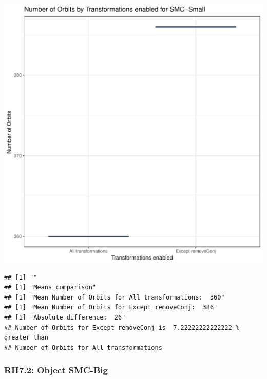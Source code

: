 \documentclass{article}\usepackage[]{graphicx}\usepackage[]{color}
\makeatletter
\def\maxwidth{ %
  \ifdim\Gin@nat@width>\linewidth
    \linewidth
  \else
    \Gin@nat@width
  \fi
}
\newenvironment{kframe}{%
 \def\at@end@of@kframe{}%
 \ifinner\ifhmode%
  \def\at@end@of@kframe{\end{minipage}}%
  \begin{minipage}{\columnwidth}%
 \fi\fi%
 \def\FrameCommand##1{\hskip\@totalleftmargin \hskip-\fboxsep
 \colorbox{shadecolor}{##1}\hskip-\fboxsep
     \hskip-\linewidth \hskip-\@totalleftmargin \hskip\columnwidth}%
 \MakeFramed {\advance\hsize-\width
   \@totalleftmargin\z@ \linewidth\hsize
   \@setminipage}}%
 {\par\unskip\endMakeFramed%
 \at@end@of@kframe}
\newenvironment{knitrout}{}{} %
\makeatother
\begin{document}
\begin{knitrout}
\color{fgcolor}
\includegraphics[width=\maxwidth]{figure/RH7_small-1} 
\begin{kframe}

{\ttfamily\noindent\bfseries\color{errorcolor}{\#\# Error in eval(expr, envir, enclos): object 'shap\_cashew\_small' not found}}\begin{verbatim}
## [1] ""
## [1] "Means comparison"
## [1] "Mean Number of Orbits for All transformations:  360"
## [1] "Mean Number of Orbits for Except removeConj:  386"
## [1] "Absolute difference:  26"
## Number of Orbits for Except removeConj is  7.22222222222222 % greater than 
## Number of Orbits for All transformations
\end{verbatim}
\end{kframe}
\end{knitrout}


\subsubsection{RH7.2: Object SMC-Big}
\end{document}
